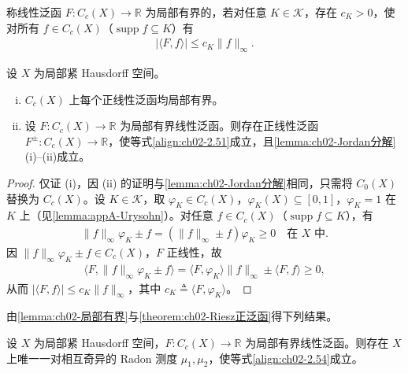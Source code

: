 \documentclass[../../main.tex]{subfiles}%
\begin{document}
\begin{definition}\label{definition:ch02-局部有界泛函}
称线性泛函 $F:C_c(X)\to\mathbb R$ 为局部有界的，若对任意 $K\in\mathscr K$，存在 $c_K>0$，使对所有 $f\in C_c(X)$（$\operatorname{supp}f\subseteq K$）有
\begin{align*}
|\langle F,f\rangle|\leqslant c_K\|f\|_\infty.
\end{align*}
\end{definition}

\begin{lemma}\label{lemma:ch02-局部有界}
设 $X$ 为局部紧 Hausdorff 空间。
\begin{enumerate}[(i)]
\item $C_c(X)$ 上每个正线性泛函均局部有界。
\item 设 $F:C_c(X)\to\mathbb R$ 为局部有界线性泛函。则存在正线性泛函 $F^\pm:C_c(X)\to\mathbb R$，使等式\eqref{align:ch02-2.51}成立，且\cref{lemma:ch02-Jordan分解}(i)--(ii)成立。
\end{enumerate}
\end{lemma}

\begin{proof}
仅证 (i)，因 (ii) 的证明与\cref{lemma:ch02-Jordan分解}相同，只需将 $C_0(X)$ 替换为 $C_c(X)$。设 $K\in\mathscr K$，取 $\varphi_K\in C_c(X)$，$\varphi_K(X)\subseteq[0,1]$，$\varphi_K=1$ 在 $K$ 上（见\cref{lemma:appA-Urysohn}）。对任意 $f\in C_c(X)$（$\operatorname{supp}f\subseteq K$），有
\begin{align*}
\|f\|_\infty\varphi_K\pm f=(\|f\|_\infty\pm f)\varphi_K\geqslant0\quad\text{在 }X\text{ 中}.
\end{align*}
因 $\|f\|_\infty\varphi_K\pm f\in C_c(X)$，$F$ 正线性，故
\begin{align*}
\langle F,\|f\|_\infty\varphi_K\pm f\rangle=\langle F,\varphi_K\rangle\|f\|_\infty\pm\langle F,f\rangle\geqslant0,
\end{align*}
从而 $|\langle F,f\rangle|\leqslant c_K\|f\|_\infty$，其中 $c_K\triangleq \langle F,\varphi_K\rangle$。
\end{proof}

由\cref{lemma:ch02-局部有界}与\cref{theorem:ch02-Riesz正泛函}得下列结果。

\begin{theorem}\label{theorem:ch02-RieszCc}
设 $X$ 为局部紧 Hausdorff 空间，$F:C_c(X)\to\mathbb R$ 为局部有界线性泛函。则存在 $X$ 上唯一一对相互奇异的 Radon 测度 $\mu_1,\mu_2$，使等式\eqref{align:ch02-2.54}成立。
\end{theorem}
\end{document}
